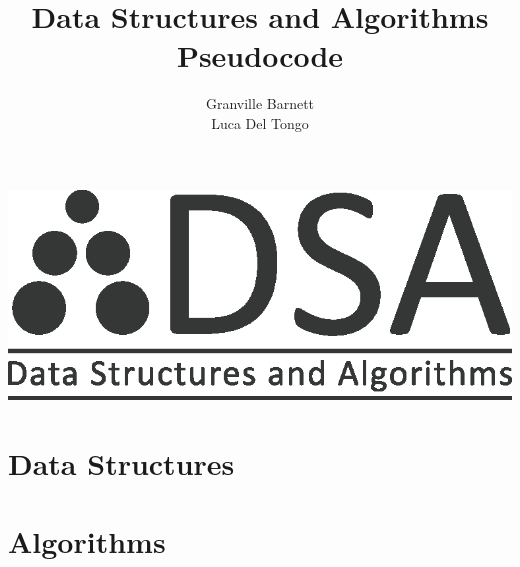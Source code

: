 \documentclass[10pt,oneside,a4paper]{report}
\begin{document}
\title{Data Structures and Algorithms\\Pseudocode}
\includegraphics{dsa_logo}
\author{Granville Barnett\\Luca Del Tongo}
\maketitle

\newpage
\tableofcontents
\newpage

\pagestyle{headings}




\part{Data Structures}







\part{Algorithms}






\appendix


\end{document}

